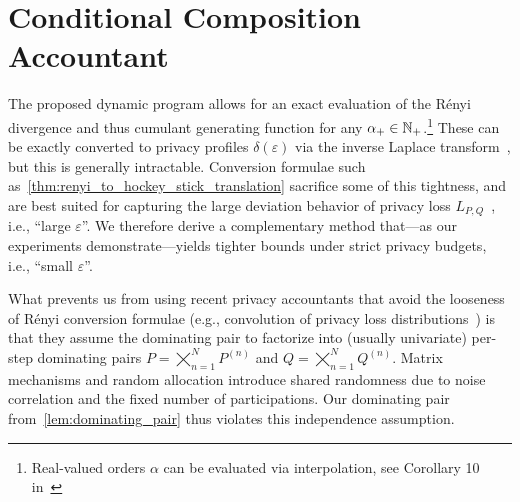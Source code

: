 \documentclass{article}
\theoremstyle{plain}
\theoremstyle{definition}
\theoremstyle{remark}
\renewcommand{\epsilon}{\varepsilon}
\begin{document}
\section{Conditional Composition Accountant}
The proposed dynamic program allows for an exact evaluation of the R\'enyi divergence and thus cumulant generating function for any $\alpha_+ \in {\mathbb{N}}_+$.\footnote{Real-valued orders $\alpha$ can be evaluated via interpolation, see Corollary 10 in~\cite{wang2019subsampled}}
These can be exactly converted to privacy profiles $\delta(\epsilon)$ via the inverse Laplace transform~\cite{zhu2022optimal}, but this is generally intractable. Conversion formulae such as~\cref{thm:renyi_to_hockey_stick_translation} sacrifice some of this tightness, and are best suited for capturing the large deviation behavior of privacy loss $L_{P,Q}$~\cite{alghamdi2023saddle}, i.e., ``large $\epsilon$''.
We therefore derive a complementary method that---as our experiments demonstrate---yields tighter bounds under strict privacy budgets, i.e., ``small $\epsilon$''.

What prevents us from using recent privacy accountants that avoid the looseness of R\'enyi conversion formulae  (e.g., convolution of privacy loss distributions~\cite{sommer2019privacyloss,koskela2020computing})
is that they assume the dominating pair to factorize into (usually univariate) per-step dominating pairs 
$P = \bigtimes_{n=1}^N P^{(n)}$ and $Q = \bigtimes_{n=1}^N Q^{(n)}$.
Matrix mechanisms and random allocation introduce shared randomness 
due to noise correlation and the fixed number of participations.
Our dominating pair from~\cref{lem:dominating_pair} thus violates this independence assumption.
\end{document}
